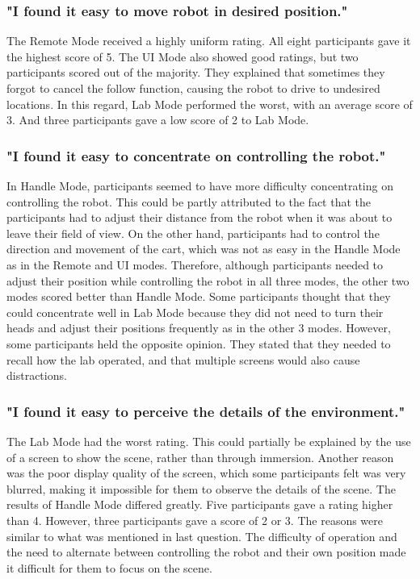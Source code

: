 \subsubsection{"I found it easy to move robot in desired position."}
The Remote Mode received a highly uniform rating. All eight participants gave it the highest score of 5. The UI Mode also showed good ratings, but two participants scored out of the majority. They explained that sometimes they forgot to cancel the follow function, causing the robot to drive to undesired locations. In this regard, Lab Mode performed the worst, with an average score of 3. And three participants gave a low score of 2 to Lab Mode.


\subsubsection{"I found it easy to concentrate on controlling the robot."}

In Handle Mode, participants seemed to have more difficulty concentrating on controlling the robot. This could be partly attributed to the fact that the participants had to adjust their distance from the robot when it was about to leave their field of view. On the other hand, participants had to control the direction and movement of the cart, which was not as easy in the Handle Mode as in the Remote and UI modes. Therefore, although participants needed to adjust their position while controlling the robot in all three modes, the other two modes scored better than Handle Mode. Some participants thought that they could concentrate well in Lab Mode because they did not need to turn their heads and adjust their positions frequently as in the other 3 modes. However, some participants held the opposite opinion. They stated that they needed to recall how the lab operated, and that multiple screens would also cause distractions.


\subsubsection{"I found it easy to perceive the details of the environment."}
The Lab Mode had the worst rating. This could partially be explained by the use of a screen to show the scene, rather than through immersion. Another reason was the poor display quality of the screen, which some participants felt was very blurred, making it impossible for them to observe the details of the scene. The results of Handle Mode differed greatly. Five participants gave a rating higher than 4. However, three participants gave a score of 2 or 3. The reasons were similar to what was mentioned in last question. The difficulty of operation and the need to alternate between controlling the robot and their own position made it difficult for them to focus on the scene.


